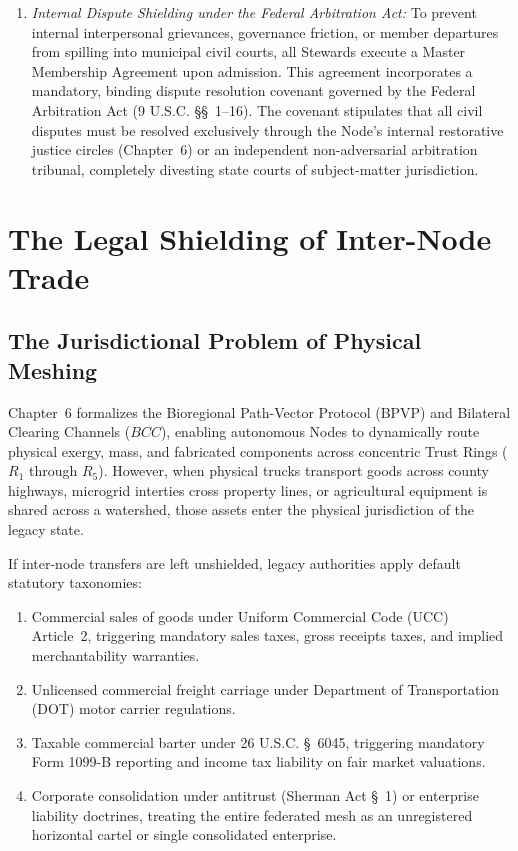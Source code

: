 \begin{enumerate}
  \item \textit{Internal Dispute Shielding under the Federal Arbitration Act:} To prevent internal interpersonal grievances, governance friction, or member departures from spilling into municipal civil courts, all Stewards execute a Master Membership Agreement upon admission. This agreement incorporates a mandatory, binding dispute resolution covenant governed by the Federal Arbitration Act (9 U.S.C. \S\S~1--16). The covenant stipulates that all civil disputes must be resolved exclusively through the Node's internal restorative justice circles (Chapter~6) or an independent non-adversarial arbitration tribunal, completely divesting state courts of subject-matter jurisdiction.
\end{enumerate}

\section{The Legal Shielding of Inter-Node Trade}
\label{sec:l7-trade}

\subsection{The Jurisdictional Problem of Physical Meshing}

Chapter~6 formalizes the Bioregional Path-Vector Protocol (BPVP) and Bilateral Clearing Channels ($BCC$), enabling autonomous Nodes to dynamically route physical exergy, mass, and fabricated components across concentric Trust Rings ($R_1$ through $R_5$). However, when physical trucks transport goods across county highways, microgrid interties cross property lines, or agricultural equipment is shared across a watershed, those assets enter the physical jurisdiction of the legacy state.

If inter-node transfers are left unshielded, legacy authorities apply default statutory taxonomies:
\begin{enumerate}
  \item Commercial sales of goods under Uniform Commercial Code (UCC) Article~2, triggering mandatory sales taxes, gross receipts taxes, and implied merchantability warranties.
  \item Unlicensed commercial freight carriage under Department of Transportation (DOT) motor carrier regulations.
  \item Taxable commercial barter under 26 U.S.C. \S~6045, triggering mandatory Form 1099-B reporting and income tax liability on fair market valuations.
  \item Corporate consolidation under antitrust (Sherman Act \S~1) or enterprise liability doctrines, treating the entire federated mesh as an unregistered horizontal cartel or single consolidated enterprise.
\end{enumerate}

